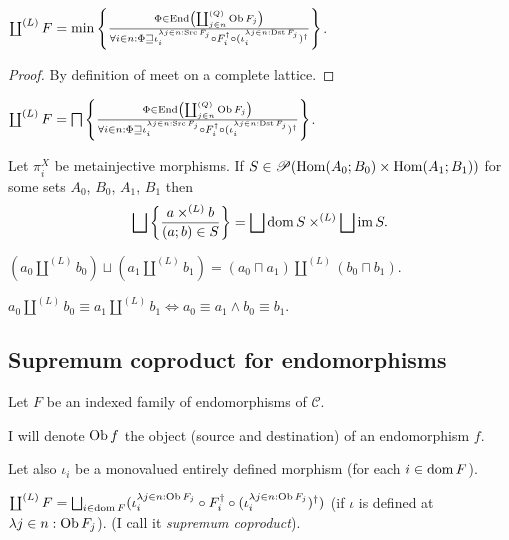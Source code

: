 \begin{prop}
  $\coprod^{(L)} F = \min \left\{ \frac{ \Phi \in \operatorname{End} \left( \coprod^{(Q)}_{j
  \in n} \operatorname{Ob} F_j \right) }{ \forall i \in n :
  \Phi \sqsupseteq \iota^{\lambda j \in n : \operatorname{Src} F_j}_i \circ
  F_i^{\dagger} \circ (\iota^{\lambda j \in n : \operatorname{Dst} F_j}_i)^{\dagger} }\right\}$.
\end{prop}

\begin{proof}
  By definition of meet on a complete lattice.
\end{proof}

\begin{cor}
  $\coprod^{(L)} F = \bigsqcap \left\{ \frac{ \Phi \in \operatorname{End} \left(
  \coprod^{(Q)}_{j \in n} \operatorname{Ob} F_j \right) }{
  \forall i \in n : \Phi \sqsupseteq \iota^{\lambda j \in n : \operatorname{Src}
  F_j}_i \circ F_i^{\dagger} \circ (\iota^{\lambda j \in n : \operatorname{Dst}
  F_j}_i)^{\dagger} }\right\}$.
\end{cor}

\begin{thm}
  Let $\pi^X_i$ be metainjective morphisms. If $S \in \mathscr{P} (\operatorname{Hom}
  (A_0 ; B_0) \times \operatorname{Hom} (A_1 ; B_1))$ for some sets $A_0$, $B_0$,
  $A_1$, $B_1$ then
  \[ \bigsqcup \setcond{ a \times^{(L)} b }{ (a ; b)
     \in S } = \bigsqcup \dom S \times^{(L)} \bigsqcup \im
     S. \]
\end{thm}

\begin{cor}
  $(a_0 \amalg^{(L)} b_0) \sqcup (a_1 \amalg^{(L)} b_1) = (a_0 \sqcap a_1)
  \amalg^{(L)} (b_0 \sqcap b_1)$.
\end{cor}

\begin{cor}
  $a_0 \amalg^{(L)} b_0 \equiv a_1 \amalg^{(L)} b_1 \Leftrightarrow a_0 \equiv
  a_1 \wedge b_0 \equiv b_1$.
\end{cor}

\subsection{Supremum coproduct for endomorphisms}

Let $F$ be an indexed family of endomorphisms of $\mathcal{C}$.

I will denote $\operatorname{Ob} f$ the object (source and destination) of an
endomorphism $f$.

Let also $\iota_i$ be a monovalued entirely defined morphism (for each $i \in
\operatorname{dom} F$).

\begin{defn}
  $\coprod^{(L)} F = \bigsqcup_{i \in \dom F} (\iota^{\lambda j \in n :
  \Ob F_j}_i \circ F_i^{\dagger} \circ (\iota^{\lambda j \in n :
  \Ob F_j}_i)^{\dagger})$ (if $\iota$ is defined at $\lambda j \in n :
  \operatorname{Ob} F_j$). (I call it \emph{supremum coproduct}).
\end{defn}

